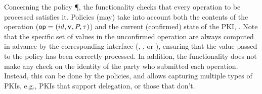 Concerning the policy \P, the functionality checks that every operation to be
processed satisfies it. Policies (may) take into account both the contents of
the operation ($\mathsf{op} = (id,\mathbf{v},P,\tau)$) and the current (confirmed)
state of the PKI, \VDRL. Note that the specific set of values \sval in the
unconfirmed operation are always computed in advance by the corresponding
interface (, , or ), ensuring that
the value passed to the policy has been correctly processed. In addition, the
functionality does not make any check on the identity of the party who submitted
each operation. Instead, this can be done by the policies, and allows capturing
multiple types of PKIs, e.g., PKIs that support delegation, or those that don't.

